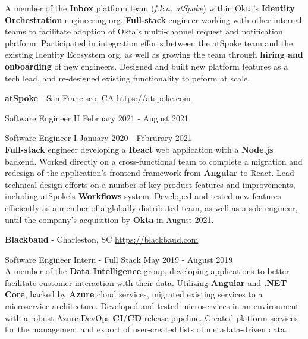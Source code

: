 \documentclass[margin,line]{resume}
\newcommand{\rurl}[1]{\hfill {\footnotesize \url{#1}}}
\newcommand{\rdate}[1]{\hfill {\small #1}}
\begin{document}
\begin{resume}
\begin{asparablank}
    \small A member of the \textbf{Inbox} platform team (\textit{f.k.a. atSpoke}) within Okta's \textbf{Identity Orchestration} engineering org.
    \small \textbf{Full-stack} engineer working with other internal teams to facilitate adoption of Okta's multi-channel request and notification platform.
    \small Participated in integration efforts between the atSpoke team and the existing Identity Ecosystem org, as well as growing the team through \textbf{hiring and onboarding} of new engineers.
	\small Designed and built new platform features as a tech lead, and re-designed existing functionality to peform at scale.
    \normalsize
    \\
    \item{\bf atSpoke} - San Francisco, CA \rurl{https://atspoke.com}
    \small \item Software Engineer II \rdate{February 2021 - August 2021}
    \small \item Software Engineer I \rdate{January 2020 - Februrary 2021} \\

    \small \textbf{Full-stack} engineer developing a \textbf{React} web application with a \textbf{Node.js} backend.
    \small Worked directly on a cross-functional team to complete a migration and redesign of the application's frontend framework from \textbf{Angular} to React.
    \small Lead technical design efforts on a number of key product features and improvements, including atSpoke's \textbf{Workflows} system.
    \small Developed and tested new features efficiently as a member of a globally distributed team, as well as a sole engineer, until the company's acquisition by \textbf{Okta} in August 2021.
    \normalsize
    \\
	\item{\bf Blackbaud} - Charleston, SC \rurl{https://blackbaud.com}
	\small \item Software Engineer Intern - Full Stack \rdate{May 2019 - August 2019} \\

	\small A member of the \textbf{Data Intelligence} group, developing applications to better facilitate customer interaction with their data.
	\small Utilizing \textbf{Angular} and \textbf{.NET Core}, backed by \textbf{Azure} cloud services, migrated existing services to a microservice architecture.
	\small Developed and tested microservices in an environment with a robust Azure DevOps \textbf{CI}/\textbf{CD} release pipeline.
	\small Created platform services for the management and export of user-created lists of metadata-driven data.
	\normalsize
	\end{asparablank}


\end{resume}
\end{document}
